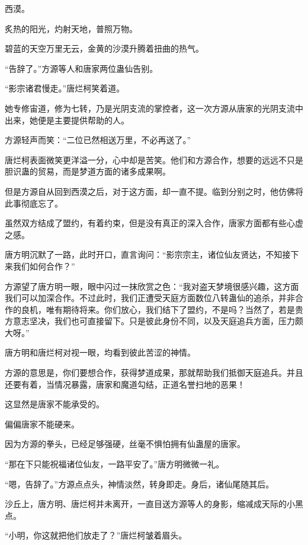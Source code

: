 
\begin{this_body}

西漠。

炙热的阳光，灼射天地，普照万物。

碧蓝的天空万里无云，金黄的沙漠升腾着扭曲的热气。

“告辞了。”方源等人和唐家两位蛊仙告别。

“影宗诸君慢走。”唐烂柯笑着道。

她专修宙道，修为七转，乃是光阴支流的掌控者，这一次方源从唐家的光阴支流中出来，她便是主要提供帮助的人。

方源轻声而笑：“二位已然相送万里，不必再送了。”

唐烂柯表面微笑更洋溢一分，心中却是苦笑。他们和方源合作，想要的远远不只是胆识蛊的贸易，而是梦道方面的诸多成果啊。

但是方源自从回到西漠之后，对于这方面，却一直不提。临到分别之时，他仿佛将此事彻底忘了。

虽然双方结成了盟约，有着约束，但是没有真正的深入合作，唐家方面都有些心虚之感。

唐方明沉默了一路，此时开口，直言询问：“影宗宗主，诸位仙友贤达，不知接下来我们如何合作？”

方源望了唐方明一眼，眼中闪过一抹欣赏之色：“我对盗天梦境很感兴趣，这方面我们可以加深合作。不过此时，我们正遭受天庭方面数位八转蛊仙的追杀，并非合作的良机，唯有期待将来。你们放心，我们结下了盟约，不是吗？当然了，若是贵方意志坚决，我们也可直接留下。只是彼此身份不同，以及天庭追兵方面，压力颇大呀。”

唐方明和唐烂柯对视一眼，均看到彼此苦涩的神情。

方源的意思是，你们要想合作，获得梦道成果，那就帮助我们抵御天庭追兵。并且还要有着，当情况暴露，唐家和魔道勾结，正道名誉扫地的恶果！

这显然是唐家不能承受的。

偏偏唐家不能硬来。

因为方源的拳头，已经足够强硬，丝毫不惧怕拥有仙蛊屋的唐家。

“那在下只能祝福诸位仙友，一路平安了。”唐方明微微一礼。

“嗯，告辞了。”方源点点头，神情淡然，转身即走。身后，诸仙尾随其后。

沙丘上，唐方明、唐烂柯并未离开，一直目送方源等人的身影，缩减成天际的小黑点。

“小明，你这就把他们放走了？”唐烂柯皱着眉头。


\end{this_body}
